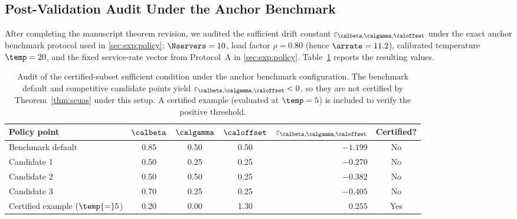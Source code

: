 \subsection{Post-Validation Audit Under the Anchor Benchmark}
\label{sec:scuas_audit}

After completing the manuscript theorem revision, we audited the sufficient drift constant
$\varepsilon_{\calbeta,\calgamma,\caloffset}$ under the exact anchor benchmark protocol used in \cref{sec:exp:policy}:
$\Nservers = 10$, load factor $\rho = 0.80$ (hence $\arrate = 11.2$), calibrated temperature $\temp = 20$,
and the fixed service-rate vector from Protocol~A in \cref{sec:exp:policy}.
Table~\ref{tab:scuas_audit} reports the resulting values.

\begin{table}[htbp]
\centering
\small
\caption{Audit of the certified-subset sufficient condition under the anchor benchmark configuration. The benchmark default and competitive candidate points yield $\varepsilon_{\calbeta,\calgamma,\caloffset} < 0$, so they are not certified by Theorem~\ref{thm:scuas} under this setup. A certified example (evaluated at $\temp=5$) is included to verify the positive threshold.}
\label{tab:scuas_audit}
\renewcommand{\arraystretch}{1.2}
\begin{tabular}{@{}lccc r c@{}}
\toprule
\textbf{Policy point} & $\calbeta$ & $\calgamma$ & $\caloffset$ & $\varepsilon_{\calbeta,\calgamma,\caloffset}$ & \textbf{Certified?} \\
\midrule
Benchmark default        & 0.85 & 0.50 & 0.50 & $-1.199$ & No \\
Candidate 1              & 0.50 & 0.25 & 0.25 & $-0.270$ & No \\
Candidate 2              & 0.50 & 0.50 & 0.25 & $-0.382$ & No \\
Candidate 3              & 0.70 & 0.25 & 0.25 & $-0.405$ & No \\
\addlinespace[3pt]
Certified example ($\temp{=}5$) & 0.20 & 0.00 & 1.30 & $0.255$ & Yes \\
\bottomrule
\end{tabular}
\end{table}

